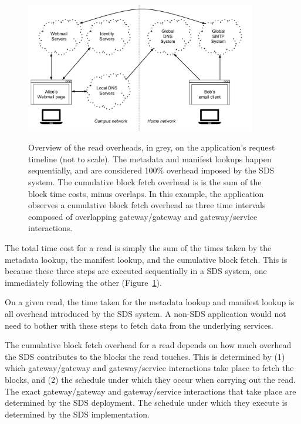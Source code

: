 \begin{figure}[h]
   \caption{Overview of the read overheads, in grey, on the application's
request timeline (not to scale).  The metadata and manifest lookups
happen sequentially, and are considered 100\% overhead imposed by the SDS
system.  The cumulative block fetch overhead is
is the sum of the block time costs, minus overlaps.  In this example, the
application observes a cumulative block fetch overhead as three time intervals
composed of overlapping gateway/gateway and gateway/service interactions.}
   \centering
   \includegraphics[width=0.9\textwidth,page=30]{figures/dissertation-figures}
   \label{fig:evaluation-read-overheads}
\end{figure}

The total time cost for a read is simply the sum of the times taken by the
metadata lookup, the manifest lookup, and the cumulative block fetch.  This is
because these three steps are executed sequentially in a SDS system, one
immediately following the other (Figure~\ref{fig:evaluation-read-overheads}).

On a given read, the time taken for the metadata lookup and manifest lookup is
all overhead introduced by the SDS system.  A non-SDS application would not
need to bother with these steps to fetch data from the underlying services.

The cumulative block fetch overhead for a read depends on how much overhead the SDS contributes
to the blocks the read touches.  This is determined by (1) which
gateway/gateway and gateway/service interactions take place to
fetch the blocks, and (2) the schedule under which they occur when carrying out
the read.  The exact gateway/gateway and gateway/service interactions that take
place are determined by the SDS deployment.  The schedule under which they
execute is determined by the SDS implementation.

